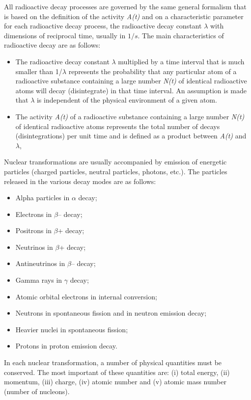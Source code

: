 \documentclass{article}
\begin{document}
All radioactive decay processes are governed by the same general
formalism that is based on the definition of the activity \textit{A(t)} and on a characteristic
parameter for each radioactive decay process, the radioactive decay constant $\lambda$ with dimensions of reciprocal time, usually in $1/s$. The main characteristics of
radioactive decay are as follows:
\begin{itemize}
    \item The radioactive decay constant $\lambda$ multiplied by a time interval that is much
smaller than 1/$\lambda$ represents the probability that any particular atom of a
radioactive substance containing a large number \textit{N(t)} of identical radioactive
atoms will decay (disintegrate) in that time interval. An assumption is made
that $\lambda$ is independent of the physical environment of a given atom.
    \item The activity \textit{A(t)} of a radioactive substance containing a large number
\textit{N(t)} of identical radioactive atoms represents the total number of decays
(disintegrations) per unit time and is defined as a product between \textit{A(t)} and $\lambda$,
\end{itemize}

Nuclear transformations are usually accompanied by emission of energetic
particles (charged particles, neutral particles, photons, etc.). The particles released
in the various decay modes are as follows:
\begin{itemize}
    \item Alpha particles in $\alpha$ decay;
    \item Electrons in $\beta$– decay;
\item Positrons in $\beta$+ decay;
\item Neutrinos in $\beta$+ decay;
\item Antineutrinos in $\beta$– decay;
\item Gamma rays in $\gamma$ decay;
\item Atomic orbital electrons in internal conversion;
\item Neutrons in spontaneous fission and in neutron emission decay;
\item Heavier nuclei in spontaneous fission;
\item Protons in proton emission decay.
\end{itemize}

In each nuclear transformation, a number of physical quantities must
be conserved. The most important of these quantities are: (i) total energy,
(ii) momentum, (iii) charge, (iv) atomic number and (v) atomic mass number
(number of nucleons).
\end{document}
